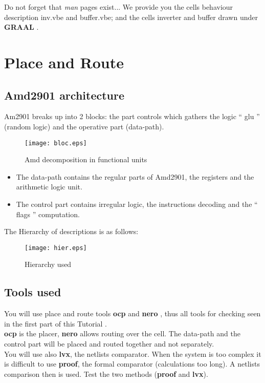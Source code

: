 \documentclass[12pt]{article}
\begin{document}
Do not forget that { \it man } pages exist...
We provide you the cells behaviour description inv.vbe and buffer.vbe;
and the cells inverter and buffer drawn under { \bf GRAAL }.


\section{Place and Route}

\subsection{Amd2901 architecture}

Am2901 breaks up into 2 blocks: the part controls which gathers
the logic `` glu '' (random logic) and the operative part (data-path).

\begin{figure}[H]\centering
  \texttt{[image: bloc.eps]}
  \caption{Amd decomposition in functional units}
  \label{Fig:decomposition}
\end{figure}


\begin{itemize}\itemsep=-.4ex
\item The data-path contains the regular parts of Amd2901, the registers
     and the arithmetic logic unit.
\item The control part contains irregular logic, 
    the instructions decoding and the `` flags '' computation.
\end{itemize}

The Hierarchy of descriptions is as follows:
\begin{figure}[H]\centering
  \texttt{[image: hier.eps]}
  \caption{Hierarchy used}
  \label{Fig:hierarchie}
\end{figure}

\subsection{Tools used}

You will use place and route tools { \bf ocp } and {\bf nero },
thus all tools for checking seen in the first part of this Tutorial .\\
{\bf ocp} is the placer, {\bf nero} allows routing over the cell.
The data-path and the control part will be placed and routed together and not separately. \\
You will use also {\bf lvx}, the netlists comparator. When the
system is too complex it is difficult to use {\bf proof}, the
formal comparator (calculations too long). A netlists comparison 
then is used. Test the two methods ({\bf proof} and {\bf
lvx}).
\end{document}

